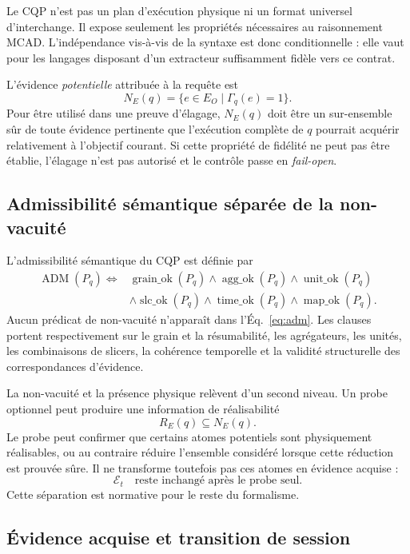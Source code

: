 \documentclass[journal]{IEEEtran}
\begin{document}
Le CQP n'est pas un plan d'exécution physique ni un format universel d'interchange. Il expose seulement les propriétés nécessaires au raisonnement MCAD. L'indépendance vis-à-vis de la syntaxe est donc conditionnelle : elle vaut pour les langages disposant d'un extracteur suffisamment fidèle vers ce contrat.

L'évidence \emph{potentielle} attribuée à la requête est
\[
N_E(q)
=
\{e\in E_O\mid \Gamma_q(e)=1\}.
\]
Pour être utilisé dans une preuve d'élagage, $N_E(q)$ doit être un sur-ensemble sûr de toute évidence pertinente que l'exécution complète de $q$ pourrait acquérir relativement à l'objectif courant. Si cette propriété de fidélité ne peut pas être établie, l'élagage n'est pas autorisé et le contrôle passe en \emph{fail-open}.

\subsection{Admissibilité sémantique séparée de la non-vacuité}

L'admissibilité sémantique du CQP est définie par
\begin{equation}
\label{eq:adm}
\begin{aligned}
\operatorname{ADM}(P_q)
\Longleftrightarrow {}&
\operatorname{grain\_ok}(P_q)
\wedge
\operatorname{agg\_ok}(P_q)
\wedge
\operatorname{unit\_ok}(P_q)\\
&\wedge
\operatorname{slc\_ok}(P_q)
\wedge
\operatorname{time\_ok}(P_q)
\wedge
\operatorname{map\_ok}(P_q).
\end{aligned}
\end{equation}
Aucun prédicat de non-vacuité n'apparaît dans l'Éq.~\eqref{eq:adm}. Les clauses portent respectivement sur le grain et la résumabilité, les agrégateurs, les unités, les combinaisons de slicers, la cohérence temporelle et la validité structurelle des correspondances d'évidence.

La non-vacuité et la présence physique relèvent d'un second niveau. Un probe optionnel peut produire une information de réalisabilité
\[
R_E(q)\subseteq N_E(q).
\]
Le probe peut confirmer que certains atomes potentiels sont physiquement réalisables, ou au contraire réduire l'ensemble considéré lorsque cette réduction est prouvée sûre. Il ne transforme toutefois pas ces atomes en évidence acquise :
\[
\mathcal{E}_t
\quad\text{reste inchangé après le probe seul.}
\]
Cette séparation est normative pour le reste du formalisme.

\subsection{Évidence acquise et transition de session}
\end{document}
